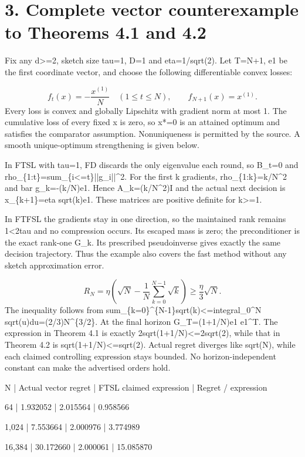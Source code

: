 \documentclass[10pt]{article}
\begin{document}
\section*{3. Complete vector counterexample to Theorems 4.1 and 4.2}
Fix any d>=2, sketch size tau=1, D=1 and eta=1/sqrt(2). Let T=N+1, e1 be the first coordinate vector, and choose the following differentiable convex losses:\par
\[f_t(x)=-\frac{x^{(1)}}{N}\quad(1\le t\le N),\qquad f_{N+1}(x)=x^{(1)}.\] Every loss is convex and globally Lipschitz with gradient norm at most 1. The cumulative loss of every fixed x is zero, so x*=0 is an attained optimum and satisfies the comparator assumption. Nonuniqueness is permitted by the source. A smooth unique-optimum strengthening is given below.\par
In FTSL with tau=1, FD discards the only eigenvalue each round, so B\_t=0 and rho\_\{1:t\}=sum\_\{i<=t\}||g\_i||\textasciicircum{}2. For the first k gradients, rho\_\{1:k\}=k/N\textasciicircum{}2 and bar g\_k=-(k/N)e1. Hence A\_k=(k/N\textasciicircum{}2)I and the actual next decision is x\_\{k+1\}=eta sqrt(k)e1. These matrices are positive definite for k>=1.\par
In FTFSL the gradients stay in one direction, so the maintained rank remains 1<2tau and no compression occurs. Its escaped mass is zero; the preconditioner is the exact rank-one G\_k. Its prescribed pseudoinverse gives exactly the same decision trajectory. Thus the example also covers the fast method without any sketch approximation error.\par
\[R_N=\eta\left(\sqrt N-\frac1N\sum_{k=0}^{N-1}\sqrt k\right)\ge\frac{\eta}{3}\sqrt N.\] The inequality follows from sum\_\{k=0\}\textasciicircum{}\{N-1\}sqrt(k)<=integral\_0\textasciicircum{}N sqrt(u)du=(2/3)N\textasciicircum{}\{3/2\}. At the final horizon G\_T=(1+1/N)e1 e1\textasciicircum{}T. The expression in Theorem 4.1 is exactly 2sqrt(1+1/N)<=2sqrt(2), while that in Theorem 4.2 is sqrt(1+1/N)<=sqrt(2). Actual regret diverges like sqrt(N), while each claimed controlling expression stays bounded. No horizon-independent constant can make the advertised orders hold.\par
N | Actual vector regret | FTSL claimed expression | Regret / expression\par
64 | 1.932052 | 2.015564 | 0.958566\par
1,024 | 7.553664 | 2.000976 | 3.774989\par
16,384 | 30.172660 | 2.000061 | 15.085870\par
\end{document}
